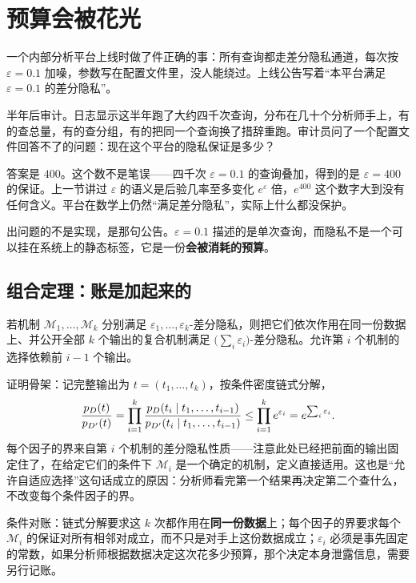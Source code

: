 \section{预算会被花光}
\label{sec:17-Constrained-Guarantees/01-Differential-Privacy/03}

一个内部分析平台上线时做了件正确的事：所有查询都走差分隐私通道，每次按 \(\varepsilon=0.1\) 加噪，参数写在配置文件里，没人能绕过。上线公告写着``本平台满足 \(\varepsilon=0.1\) 的差分隐私''。

半年后审计。日志显示这半年跑了大约四千次查询，分布在几十个分析师手上，有的查总量，有的查分组，有的把同一个查询换了措辞重跑。审计员问了一个配置文件回答不了的问题：现在这个平台的隐私保证是多少？

答案是 \(400\)。这个数不是笔误——四千次 \(\varepsilon=0.1\) 的查询叠加，得到的是 \(\varepsilon=400\) 的保证。上一节讲过 \(\varepsilon\) 的语义是后验几率至多变化 \(e^{\varepsilon}\) 倍，\(e^{400}\) 这个数字大到没有任何含义。平台在数学上仍然``满足差分隐私''，实际上什么都没保护。

出问题的不是实现，是那句公告。\(\varepsilon=0.1\) 描述的是单次查询，而隐私不是一个可以挂在系统上的静态标签，它是一份\textbf{会被消耗的预算}。

\subsection{组合定理：账是加起来的}

\begin{theorem}[基本组合]
若机制 \(\mathcal M_1,\dots,\mathcal M_k\) 分别满足 \(\varepsilon_1,\dots,\varepsilon_k\)-差分隐私，则把它们依次作用在同一份数据上、并公开全部 \(k\) 个输出的复合机制满足 \(\big(\sum_i\varepsilon_i\big)\)-差分隐私。允许第 \(i\) 个机制的选择依赖前 \(i-1\) 个输出。
\end{theorem}

证明骨架：记完整输出为 \(t=(t_1,\dots,t_k)\)，按条件密度链式分解，
\[
\frac{p_D(t)}{p_{D'}(t)}
=\prod_{i=1}^{k}\frac{p_D(t_i\mid t_1,\dots,t_{i-1})}{p_{D'}(t_i\mid t_1,\dots,t_{i-1})}
\le\prod_{i=1}^{k}e^{\varepsilon_i}=e^{\sum_i\varepsilon_i}.
\]
每个因子的界来自第 \(i\) 个机制的差分隐私性质——注意此处已经把前面的输出固定住了，在给定它们的条件下 \(\mathcal M_i\) 是一个确定的机制，定义直接适用。这也是``允许自适应选择''这句话成立的原因：分析师看完第一个结果再决定第二个查什么，不改变每个条件因子的界。

条件对账：链式分解要求这 \(k\) 次都作用在\textbf{同一份数据}上；每个因子的界要求每个 \(\mathcal M_i\) 的保证对所有相邻对成立，而不只是对手上这份数据成立；\(\varepsilon_i\) 必须是事先固定的常数，如果分析师根据数据决定这次花多少预算，那个决定本身泄露信息，需要另行记账。

